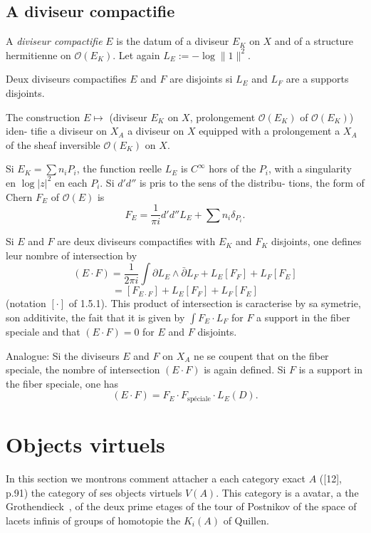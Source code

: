 \documentclass[12pt,a4paper]{article}
\theoremstyle{plain}
\theoremstyle{definition}
\newcommand{\Oo}{\mathscr{O}}
\begin{document}
\subsection{A diviseur compactifie}

\begin{minipage}[t]{0.48\textwidth}
A \emph{diviseur compactifie} $E$
is the datum of a diviseur $E_K$
on $X$ and of a structure hermitienne
on $\Oo(E_K)$. Let again
$L_E := -\log \|1\|^2$.

Deux diviseurs compactifies $E$ and $F$ are
disjoints si $L_E$ and $L_F$ are a supports
disjoints.
\end{minipage}
\hfill
\begin{minipage}[t]{0.48\textwidth}
The construction $E \mapsto$ (diviseur $E_K$ on
$X$, prolongement $\Oo(E_K)$ of $\Oo(E_K)$) iden-
tifie a diviseur on $X_A$ a diviseur
on $X$ equipped with a prolongement a
$X_A$ of the sheaf inversible $\Oo(E_K)$ on
$X$.
\end{minipage}

\smallskip

Si $E_K = \sum n_i P_i$, the function reelle $L_E$ is $C^\infty$ hors of the $P_i$, with a
singularity en $\log |z|^2$ en each $P_i$. Si $d'd''$ is pris to the sens of the distribu-
tions, the form of Chern $F_E$ of $\Oo(E)$ is
\[
F_E = \frac{1}{\pi i} d'd'' L_E + \sum n_i \delta_{P_i} .
\]

Si $E$ and $F$ are deux diviseurs compactifies with $E_K$ and $F_K$ disjoints,
one defines leur nombre of intersection by
\[
(E \cdot F) = \frac{1}{2\pi i} \int \partial L_E \wedge \bar\partial L_F + L_E [F_F] + L_F [F_E]
\]
\[
= [F_{E \cdot F}] + L_E [F_F] + L_F [F_E]
\]
(notation $[\cdot]$ of 1.5.1). This product of intersection is caracterise by sa symetrie,
son additivite, the fait that it is given by $\int F_E \cdot L_F$ for $F$ a support in the fiber
speciale and that $(E \cdot F) = 0$ for $E$ and $F$ disjoints.

Analogue: Si the diviseurs $E$ and $F$ on $X_A$ ne se coupent that on the fiber
speciale, the nombre of intersection $(E \cdot F)$ is again defined. Si $F$ is a support
in the fiber speciale, one has
\[
(E \cdot F) = F_E \cdot F_{\text{sp\'eciale}} \cdot L_E(D) .
\]



\section{Objects virtuels}

In this section we montrons comment attacher a each category exact
$A$ ([12], p.91) the category of ses objects virtuels $V(A)$. This category is a
avatar, a the Grothendieck~\cite{9}, of the deux prime etages of the tour of Postnikov
of the space of lacets infinis of groups of homotopie the $K_i(A)$ of Quillen.
\end{document}
